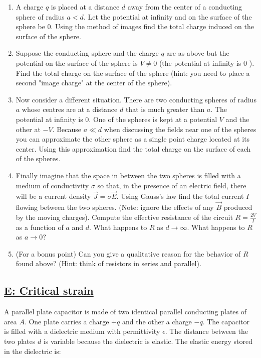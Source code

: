 \begin{enumerate}
	\item  A charge $q$ is placed at a distance $d$ away from the center of a conducting sphere of radius $a<d$. Let the potential at infinity and on the surface of the sphere be $0 .$ Using the method of images find the total charge induced on the surface of the sphere.
	\item Suppose the conducting sphere and the charge $q$ are as above but the potential on the surface of the sphere is $V \neq 0$ (the potential at infinity is 0 ). Find the total charge on the surface of the sphere (hint: you need to place a second "image charge" at the center of the sphere).
	\item Now consider a different situation. There are two conducting spheres of radius $a$ whose
	centres are at a distance $d$ that is much greater than $a .$ The potential at infinity is $0 .$ One of the spheres is kept at a potential $V$ and the other at $-V .$ Because $a \ll d$ when discussing the fields near one of the spheres you can approximate the other sphere as a single point charge located at its center. Using this approximation find the total
	charge on the surface of each of the spheres.
	\item  Finally imagine that the space in between the two spheres is filled with a medium of conductivity $\sigma$ so that, in the presence of an electric field, there will be a current density $\vec{J}=\sigma \vec{E}$. Using Gauss's law find the total current $I$ flowing between the two spheres. (Note: ignore the effects of any $\vec{B}$ produced by the moving charges). Compute the effective resistance of the circuit $R=\frac{2 V}{I}$ as a function of $a$ and $d$. What happens to $R$ as $d \rightarrow \infty$. What happens to $R$ as $a \rightarrow 0 $?
	
	\item (For a bonus point) Can you give a qualitative reason for the behavior of $R$ found
	above? (Hint: think of resistors in series and parallel).
\end{enumerate}

\subsection{\hyperref[E: Critical strain]{E: Critical strain}}

A parallel plate capacitor is made of two identical parallel conducting plates of area $A$.
One plate carries a charge $+q$ and the other a charge $-q .$ The capacitor is filled with a dielectric medium with permittivity $\epsilon$. The distance between the two plates $d$ is variable because the dielectric is elastic. The elastic energy stored in the dielectric is:

